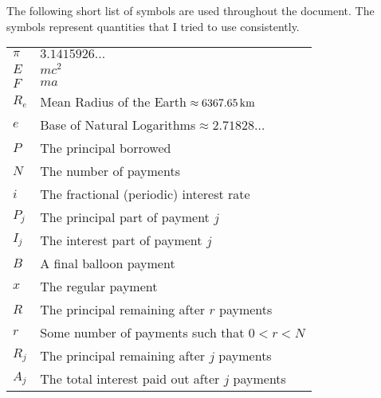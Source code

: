 \documentclass[11pt]{fsuthesis}
\begin{document}
\begin{listofsymbols}
The following short list of symbols are used throughout the document.
The symbols represent quantities that I tried to use consistently.
\begin{center}
\begin{tabular}{ll}
$\pi$&$3.1415926\ldots$\\
$E$&$mc^2$\\
$F$&$ma$\\
$R_e$&Mean Radius of the Earth${}\approx 6367.65\,\textup{km}$\\
$e$&Base of Natural Logarithms${}\approx 2.71828\ldots$\\
$P$&The principal borrowed\\
$N$&The number of payments\\
$i$&The fractional (periodic) interest rate\\
$P_j$&The principal part of payment $j$\\
$I_j$&The interest part of payment $j$\\
$B$&A final balloon payment\\
$x$&The regular payment\\
$R$&The principal remaining after $r$ payments \\
$r$&Some number of payments such that $0 < r < N$ \\
$R_j$&The principal remaining after $j$ payments \\
$A_j$&The total interest paid out after $j$ payments
\end{tabular}
\end{center}
\end{listofsymbols}



\end{document}
